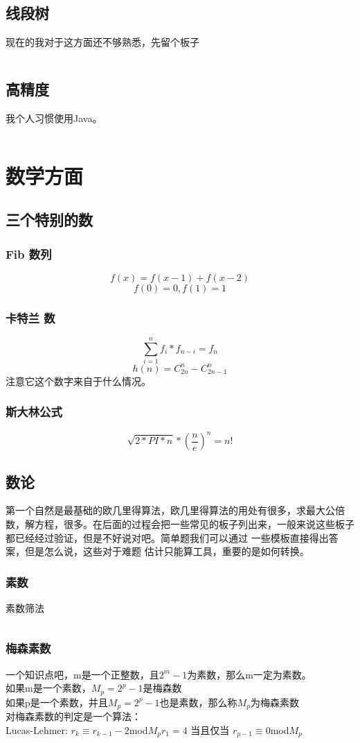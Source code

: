 \documentclass[a4paper,11pt]{article}
\begin{document}
\begin{CJK}{UTF8}{gbsn}
\subsection{线段树}
现在的我对于这方面还不够熟悉，先留个板子
\inputminted{c++}{../scoure/date/treexian.cpp}
\subsection{高精度}
我个人习惯使用Java。
\inputminted{java}{../scoure/date/bigjing.java}
\section{数学方面}
\subsection{三个特别的数}
\subsubsection{Fib 数列}
$$f(x) = f(x-1)+f(x-2)$$
$$f(0) = 0,f(1) = 1$$
\subsubsection{卡特兰 数}
$$\sum_{i=1}^n f_i*f_{n-i}=f_n$$
$$h(n) = C_{2n}^n - C_{2n-1}^{n}$$
注意它这个数字来自于什么情况。
\subsubsection{斯大林公式}
$$ \sqrt{2*PI*n} * (\frac{n}{e})^n = n!$$
\subsection{数论}
第一个自然是最基础的欧几里得算法，欧几里得算法的用处有很多，求最大公倍数，解方程，很多。在后面的过程会把一些常见的板子列出来，一般来说这些板子
都已经经过验证，但是不好说对吧。简单题我们可以通过
一些模板直接得出答案，但是怎么说，这些对于难题
估计只能算工具，重要的是如何转换。
\subsubsection{素数}
素数筛法
\inputminted{c++}{../scoure/math/shai.cpp}
\subsubsection{梅森素数}
一个知识点吧，m是一个正整数，且$2^m-1$为素数，那么m一定为素数。\\
如果m是一个素数，$M_p = 2^p-1$是梅森数\\
如果p是一个素数，并且$M_p = 2^p-1$也是素数，那么称$M_p$为梅森素数\\
对梅森素数的判定是一个算法：\\
Lucas-Lehmer:
$r_k \equiv r_{k-1} -2$\quad mod$M_p$\quad $r_1 = 4$
当且仅当 $r_{p-1} \equiv 0$\quad mod$M_p$

\end{CJK}
\end{document}
